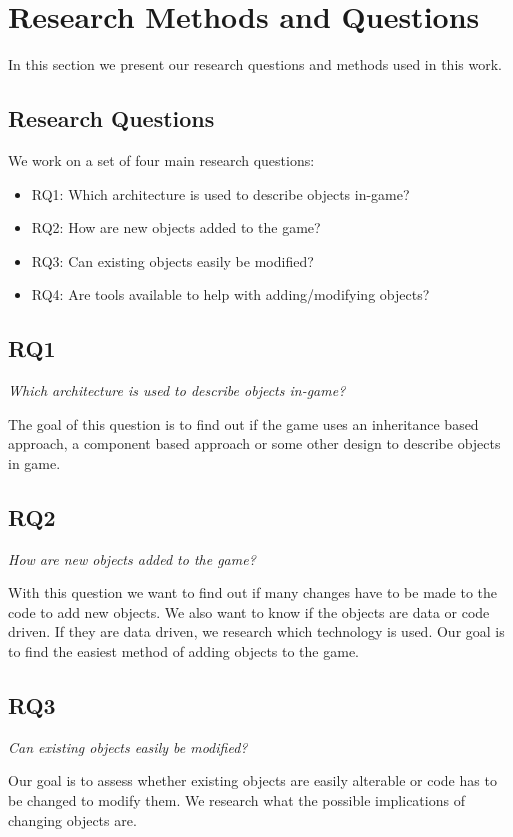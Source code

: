 \section{Research Methods and Questions}
In this section we present our research questions and methods used in this work. 

\subsection{Research Questions}
We work on a set of four main research questions:
\begin{itemize}
	\item RQ1: Which architecture is used to describe objects in-game?
	\item RQ2: How are new objects added to the game?
	\item RQ3: Can existing objects easily be modified?
	\item RQ4: Are tools available to help with adding/modifying objects?
\end{itemize}

\subsection{RQ1}
\textit{Which architecture is used to describe objects in-game?}

The goal of this question is to find out if the game uses an inheritance based approach, a component based approach or
some other design to describe objects in game. 

\subsection{RQ2}
\textit{How are new objects added to the game?}

With this question we want to find out if many changes have to be made to the code to add new objects. We also want
to know if the objects are data or code driven. If they are data driven, we research which technology is used. Our goal
is to find the easiest method of adding objects to the game.

\subsection{RQ3}
\textit{Can existing objects easily be modified?}

Our goal is to assess whether existing objects are easily alterable or code has to be changed to modify them. We
research what the possible implications of changing objects are.

